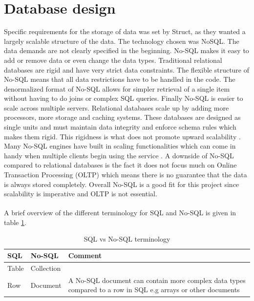 \section{Database design}
Specific requirements for the storage of data was set by Struct, as they wanted a largely scalable structure of the data. The technology chosen was \gls{NoSQL}.
The data demands are not clearly specified in the beginning. No-SQL makes it easy to add or remove data or even change the data types. Traditional relational databases are rigid and have very strict data constraints. The flexible structure of No-SQL means that all data restrictions have to be handled in the code. The denormalized format of No-SQL allows for simpler retrieval of a single item without having to do joins or complex SQL queries. Finally No-SQL is easier to scale across multiple servers. Relational databases scale up by adding more processors, more storage and caching systems. These databases are designed as single units and must maintain data integrity and enforce schema rules which makes them rigid. This rigidness is what does not promote upward scalability \cite{NoSQLScalability}.  Many No-SQL engines have built in scaling functionalities which can come in handy when multiple clients begin using the service \cite{SQLvsNOSQL}. A downside of No-SQL compared to relational databases is the fact it does not focus much on Online Transaction Processing (OLTP) which means there is no guarantee that the data is always stored completely. Overall No-SQL is a good fit for this project since scalability is imperative and OLTP is not essential. \\\\

A brief overview of the different terminology for SQL and No-SQL is given in table \ref{sqlvsnosql_table}.
\begin{table}[H]
	\centering
	\caption{SQL vs No-SQL terminology}
	\label{sqlvsnosql_table}
	\begin{tabular}{|l|l|p{8cm}|}
		\hline
		\textbf{SQL}   & \textbf{No-SQL}     & \textbf{Comment}                                                                                                    \\ \hline
		Table & Collection &                                                                                                            \\ \hline
		Row   & Document   & A No-SQL document can contain more complex data types compared to a row in SQL e.g arrays or other documents \\
		\hline
	\end{tabular}
\end{table}

